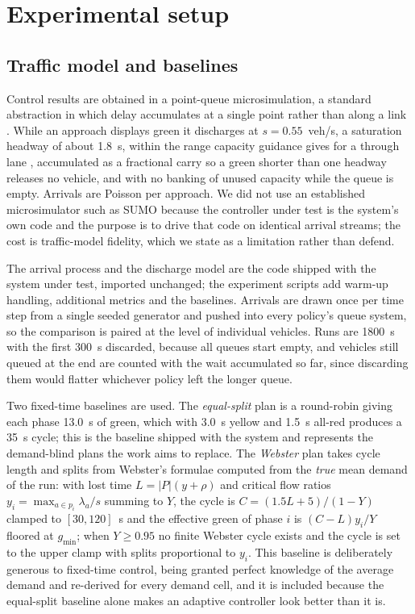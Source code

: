 \documentclass[journal]{IEEEtran}
\begin{document}
\section{Experimental setup}
\label{sec:setup}

\subsection{Traffic model and baselines}

Control results are obtained in a point-queue microsimulation, a standard abstraction in which delay
accumulates at a single point rather than along a link \cite{daganzo1997fundamentals}. While an approach
displays green it discharges at $s = 0.55$~veh/s, a saturation headway of about 1.8~s, within the range
capacity guidance gives for a through lane \cite{trb2022hcm}, accumulated as a fractional carry so a green
shorter than one headway releases no vehicle, and with no banking of unused capacity while the queue is
empty. Arrivals are Poisson per approach. We did not use an established microsimulator such as SUMO
\cite{lopez2018microscopic} because the controller under test is the system's own code and the purpose is
to drive that code on identical arrival streams; the cost is traffic-model fidelity, which we state as a
limitation rather than defend.

The arrival process and the discharge model are the code shipped with the system under test, imported
unchanged; the experiment scripts add warm-up handling, additional metrics and the baselines. Arrivals
are drawn once per time step from a single seeded generator and pushed into every policy's queue system,
so the comparison is paired at the level of individual vehicles. Runs are 1800~s with the first 300~s
discarded, because all queues start empty, and vehicles still queued at the end are counted with the
wait accumulated so far, since discarding them would flatter whichever policy left the longer queue.

Two fixed-time baselines are used. The \emph{equal-split} plan is a round-robin giving each phase 13.0~s
of green, which with 3.0~s yellow and 1.5~s all-red produces a 35~s cycle; this is the baseline shipped
with the system and represents the demand-blind plans the work aims to replace. The \emph{Webster} plan
takes cycle length and splits from Webster's formulae \cite{Webster1958TrafficSignalSettings} computed
from the \emph{true} mean demand of the run: with lost time $L = |P|(y + \rho)$ and critical flow ratios
$y_i = \max_{a \in p_i} \lambda_a / s$ summing to $Y$, the cycle is $C = (1.5L + 5)/(1 - Y)$ clamped to
$[30, 120]$~s and the effective green of phase $i$ is $(C - L) y_i / Y$ floored at $g_{\min}$; when
$Y \geq 0.95$ no finite Webster cycle exists and the cycle is set to the upper clamp with splits
proportional to $y_i$. This baseline is deliberately generous to fixed-time control, being granted
perfect knowledge of the average demand and re-derived for every demand cell, and it is included
because the equal-split baseline alone makes an adaptive controller look better than it is.
\end{document}
